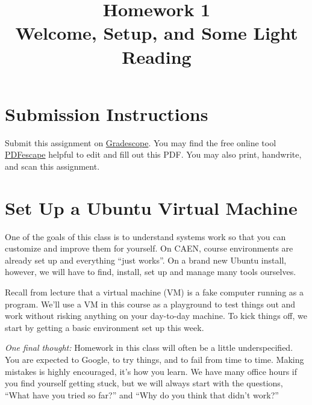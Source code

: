 \documentclass{article}
\begin{document}
\fancyhead[L]{}
\fancyhead[R]{}

\fancyfoot[C]{\thepage~/~\pageref*{LastPage}}
\pagestyle{fancyplain}


\title{\textbf{Homework 1\\Welcome, Setup, and Some Light Reading}}
\author{\textbf{\color{red}{Due: Saturday, January 14th, 10:00PM (Hard Deadline)}}}
\date{}
\maketitle


\section*{Submission Instructions}
Submit this assignment on \href{https://gradescope.com/courses/3499}{Gradescope}.
You may find the free online tool \href{https://www.pdfescape.com}{PDFescape}
helpful to edit and fill out this PDF.
You may also print, handwrite, and scan this assignment.


\section{Set Up a Ubuntu Virtual Machine}

One of the goals of this class is to understand systems work so that you can
customize and improve them for yourself.
On CAEN, course environments are already set up and everything ``just works''.
On a brand new Ubuntu install, however, we will have to find, install, set up
and manage many tools ourselves.


Recall from lecture that a virtual machine (VM) is a fake computer running as
a program. We'll use a VM in this course as a playground to test things out
and work without risking anything on your day-to-day machine. To kick things
off, we start by getting a basic environment set up this week.

\medskip
\noindent
\emph{One final thought:} Homework in this class will often be a little
underspecified. You are expected to Google, to try things, and to fail from
time to time. Making mistakes is highly encouraged, it's how you learn. We
have many office hours if you find yourself getting stuck, but we will always
start with the questions, ``What have you tried so far?'' and ``Why do you
think that didn't work?''
\end{document}

